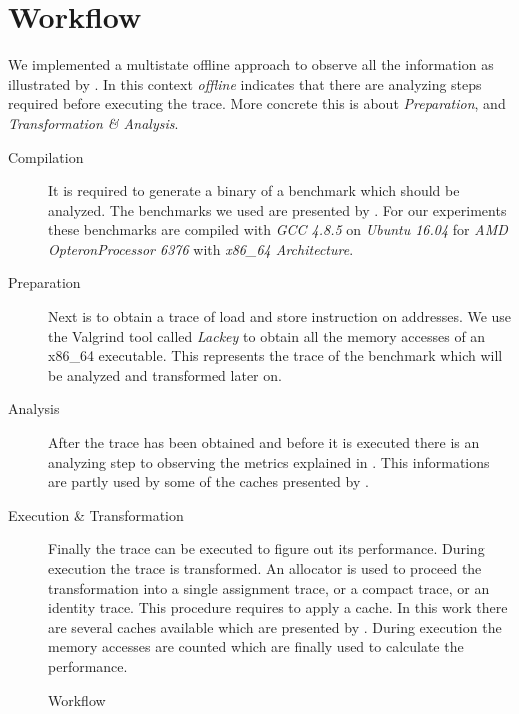 \documentclass[onecolumn, openright, master, english, signatures]{dbrgrptt}
\begin{document}
\section{Workflow}

We implemented a multistate offline approach to observe all the information as illustrated by . In this context \emph{offline} indicates that there are analyzing steps required before executing the \ac{trace}. More concrete this is about \emph{Preparation}, and \emph{Transformation \& Analysis}.

\begin{description}
  \item[Compilation] It is required to generate a binary of a benchmark which should be analyzed. The benchmarks we used are presented by . For our experiments these benchmarks are compiled with \emph{GCC 4.8.5} on \emph{Ubuntu 16.04} for \emph{AMD Opteron\texttrademark Processor 6376} with \emph{x86\_64 Architecture}.

  \item[Preparation] Next is to obtain a \ac{trace} of load and store instruction on addresses. We use the Valgrind\cite{Valgrind} tool called \emph{Lackey} to obtain all the memory accesses of an x86\_64 executable. This represents the \ac{trace} of the benchmark which will be analyzed and transformed later on.

  \item[Analysis] After the \ac{trace} has been obtained and before it is executed there is an analyzing step to observing the metrics explained in . This informations are partly used by some of the caches presented by .

  \item[Execution \& Transformation] Finally the \ac{trace} can be executed to figure out its performance. During execution the \ac{trace} is transformed. An allocator is used to proceed the transformation into a single assignment \ac{trace}, or a compact \ac{trace}, or an identity \ac{trace}. This procedure requires to apply a cache. In this work there are several caches available which are presented by . During execution the memory accesses are counted which are finally used to calculate the performance.
\end{description}

\begin{figure}[!ht]
  \centering
  
  \caption{Workflow}
  \label{fig:workflow}
\end{figure}
\end{document}
